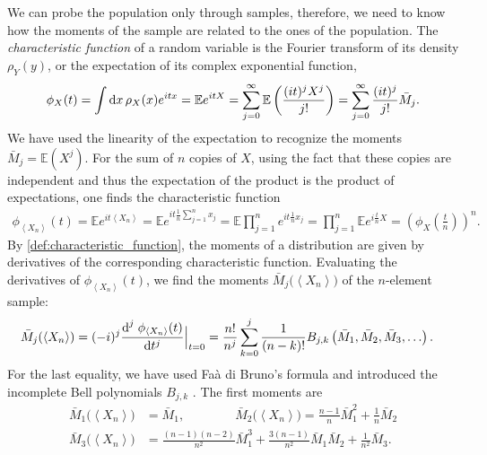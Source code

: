 \documentclass[12pt,a4paper]{article}
\renewcommand{\d}{\textnormal{d}}
\renewcommand{\|}{\rule[-0.4ex]{0.2ex}{1.2em}}
\begin{document}
We can probe the population only through samples, therefore, we need to know how the moments of the sample are related to the ones of the population.  
The \emph{characteristic function} of a random variable is the Fourier transform of its density $\rho_Y(y)$, or the expectation of its complex exponential function,
\begin{align}\label{def:characteristic_function}
	\phi_X(t) = \int \d x \, \rho_X(x) e^{itx} =\mathbb E e^{itX}   = \sum_{j=0}^\infty  \mathbb E\left(  \frac{(it)^j X^j}{j!} \right)   =\sum_{j=0}^\infty   \frac{(it)^j}{j!} \bar M_j.
\end{align}
We have used the linearity of the expectation to recognize the   moments $\bar M_j=\mathbb E(X^j)$.
For the sum of $n$ copies of $X$, using the fact that these copies are independent and thus the expectation of the product is the product of expectations, one finds the characteristic function
\begin{align*}
	\phi_{\left \langle X_n \right \rangle  }(t)=  \mathbb E e^{it \left \langle X_n \right \rangle  }=\mathbb E e^{it \frac 1 n \sum_{j=1}^n x_j}  = \mathbb E \prod_{j=1}^n e^{it\frac 1 n x_j}   = \prod_{j=1}^n \mathbb E e^{i \frac t n X}   = \left( \phi_X\left(\frac t n\right) \right) ^n.
\end{align*}
By \cref{def:characteristic_function}, the moments of a distribution are given by derivatives of the corresponding characteristic function. Evaluating the derivatives of $\phi_{\left \langle X_n \right \rangle  }(t)$, we find the moments $\bar M_j\big(\left \langle X_n \right \rangle  \big)$ of the $n$-element sample:  
\begin{align}\label{sample_mean_moments}
	\bar M_j(  \left \langle X_n \right \rangle  ) &= (-i)^j\frac{\d^j \; \phi_{\left \langle X_n \right \rangle  }(t)}{\d t^j} \Big|_{t=0} =  \frac{n!}{n^j}\sum_{k=0}^j \frac{1}{(n-k)!}B_{j,k}\left( \bar M_1 ,   \bar M_2 ,  \bar M_3  , \ldots  \right)  .
\end{align}
For the last equality, we have used  Fa\`{a} di Bruno's formula \cite{johnson_curious_2002} and introduced the incomplete Bell polynomials  $B_{j,k}$ \cite{bell_exponential_1934}. The first moments are
\begin{align}\label{sample_moments_relations}
	\bar M_1 \big( \left \langle X_n \right \rangle   \big) &= \bar M_1, \qquad \qquad \bar M_2 \big( \left \langle X_n \right \rangle  \big)  = \frac{n-1}{n} \bar M_1^2 + \frac 1 n \bar M_2 \\
	\bar M_3 \big(\left \langle X_n \right \rangle  \big) &= \frac{(n-1)(n-2)}{n^2} \bar M_1^3 +   \frac{3(n-1)}{n^2} \bar M_1 \bar M_2 + \frac{1}{n^2} \bar M_3. \nonumber
\end{align}
\end{document}
